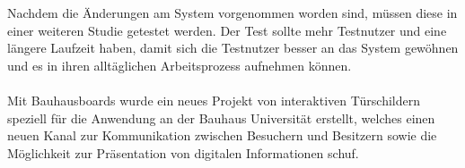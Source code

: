 \\
\\
Nachdem die Änderungen am System vorgenommen worden sind, müssen diese in einer weiteren Studie getestet werden.
Der Test sollte mehr Testnutzer und eine längere Laufzeit haben, damit sich die Testnutzer besser an das System gewöhnen und es in ihren alltäglichen Arbeitsprozess aufnehmen können.
\\
\\
Mit Bauhausboards wurde ein neues Projekt von interaktiven Türschildern speziell für die Anwendung an der Bauhaus Universität erstellt, welches einen neuen Kanal zur Kommunikation zwischen Besuchern und Besitzern sowie die Möglichkeit zur Präsentation von digitalen Informationen schuf.